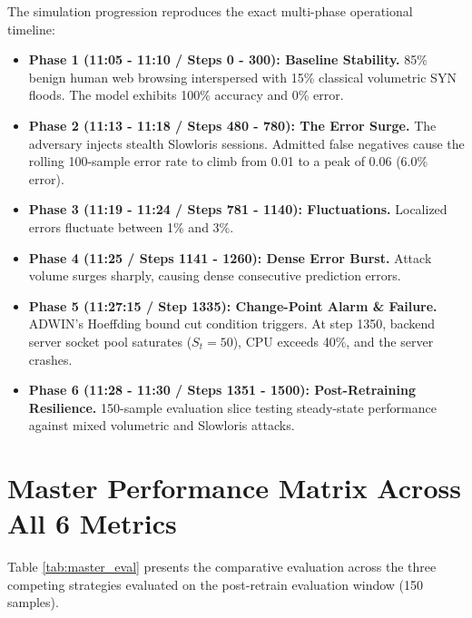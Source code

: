 \documentclass[12pt,a4paper,oneside]{report}
\begin{document}
The simulation progression reproduces the exact multi-phase operational timeline:
\begin{itemize}
    \item \textbf{Phase 1 (11:05 - 11:10 / Steps 0 - 300): Baseline Stability.} 85\% benign human web browsing interspersed with 15\% classical volumetric SYN floods. The model exhibits 100\% accuracy and 0\% error.
    \item \textbf{Phase 2 (11:13 - 11:18 / Steps 480 - 780): The Error Surge.} The adversary injects stealth Slowloris sessions. Admitted false negatives cause the rolling 100-sample error rate to climb from 0.01 to a peak of 0.06 (6.0\% error).
    \item \textbf{Phase 3 (11:19 - 11:24 / Steps 781 - 1140): Fluctuations.} Localized errors fluctuate between 1\% and 3\%.
    \item \textbf{Phase 4 (11:25 / Steps 1141 - 1260): Dense Error Burst.} Attack volume surges sharply, causing dense consecutive prediction errors.
    \item \textbf{Phase 5 (11:27:15 / Step 1335): Change-Point Alarm \& Failure.} ADWIN's Hoeffding bound cut condition triggers. At step 1350, backend server socket pool saturates ($S_t = 50$), CPU exceeds 40\%, and the server crashes.
    \item \textbf{Phase 6 (11:28 - 11:30 / Steps 1351 - 1500): Post-Retraining Resilience.} 150-sample evaluation slice testing steady-state performance against mixed volumetric and Slowloris attacks.
\end{itemize}

\section{Master Performance Matrix Across All 6 Metrics}
Table \ref{tab:master_eval} presents the comparative evaluation across the three competing strategies evaluated on the post-retrain evaluation window (150 samples).
\end{document}
